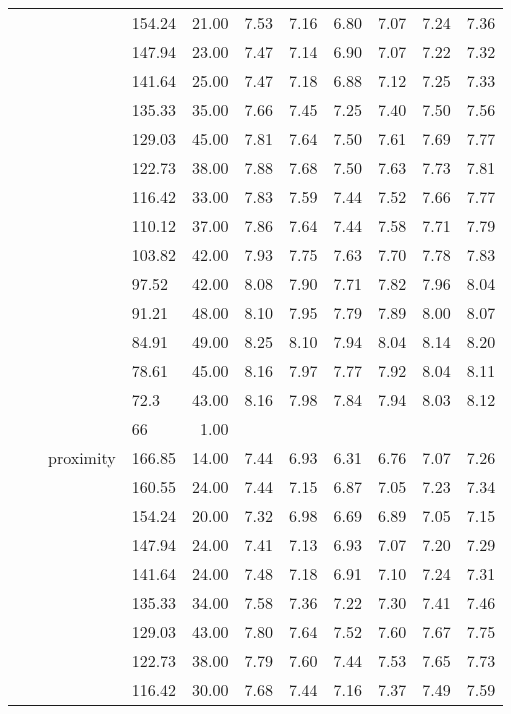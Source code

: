 \begin{longtable}{llllrrrrrrr}
   &  &  & 154.24 & 21.00 & 7.53 & 7.16 & 6.80 & 7.07 & 7.24 & 7.36 \\ 
   &  &  & 147.94 & 23.00 & 7.47 & 7.14 & 6.90 & 7.07 & 7.22 & 7.32 \\ 
   &  &  & 141.64 & 25.00 & 7.47 & 7.18 & 6.88 & 7.12 & 7.25 & 7.33 \\ 
   &  &  & 135.33 & 35.00 & 7.66 & 7.45 & 7.25 & 7.40 & 7.50 & 7.56 \\ 
   &  &  & 129.03 & 45.00 & 7.81 & 7.64 & 7.50 & 7.61 & 7.69 & 7.77 \\ 
   &  &  & 122.73 & 38.00 & 7.88 & 7.68 & 7.50 & 7.63 & 7.73 & 7.81 \\ 
   &  &  & 116.42 & 33.00 & 7.83 & 7.59 & 7.44 & 7.52 & 7.66 & 7.77 \\ 
   &  &  & 110.12 & 37.00 & 7.86 & 7.64 & 7.44 & 7.58 & 7.71 & 7.79 \\ 
   &  &  & 103.82 & 42.00 & 7.93 & 7.75 & 7.63 & 7.70 & 7.78 & 7.83 \\ 
   &  &  & 97.52 & 42.00 & 8.08 & 7.90 & 7.71 & 7.82 & 7.96 & 8.04 \\ 
   &  &  & 91.21 & 48.00 & 8.10 & 7.95 & 7.79 & 7.89 & 8.00 & 8.07 \\ 
   &  &  & 84.91 & 49.00 & 8.25 & 8.10 & 7.94 & 8.04 & 8.14 & 8.20 \\ 
   &  &  & 78.61 & 45.00 & 8.16 & 7.97 & 7.77 & 7.92 & 8.04 & 8.11 \\ 
   &  &  & 72.3 & 43.00 & 8.16 & 7.98 & 7.84 & 7.94 & 8.03 & 8.12 \\ 
   &  &  & 66 & 1.00 &  &  &  &  &  &  \\ 
   &  & proximity & 166.85 & 14.00 & 7.44 & 6.93 & 6.31 & 6.76 & 7.07 & 7.26 \\ 
   &  &  & 160.55 & 24.00 & 7.44 & 7.15 & 6.87 & 7.05 & 7.23 & 7.34 \\ 
   &  &  & 154.24 & 20.00 & 7.32 & 6.98 & 6.69 & 6.89 & 7.05 & 7.15 \\ 
   &  &  & 147.94 & 24.00 & 7.41 & 7.13 & 6.93 & 7.07 & 7.20 & 7.29 \\ 
   &  &  & 141.64 & 24.00 & 7.48 & 7.18 & 6.91 & 7.10 & 7.24 & 7.31 \\ 
   &  &  & 135.33 & 34.00 & 7.58 & 7.36 & 7.22 & 7.30 & 7.41 & 7.46 \\ 
   &  &  & 129.03 & 43.00 & 7.80 & 7.64 & 7.52 & 7.60 & 7.67 & 7.75 \\ 
   &  &  & 122.73 & 38.00 & 7.79 & 7.60 & 7.44 & 7.53 & 7.65 & 7.73 \\ 
   &  &  & 116.42 & 30.00 & 7.68 & 7.44 & 7.16 & 7.37 & 7.49 & 7.59 \\ 

\end{longtable}

